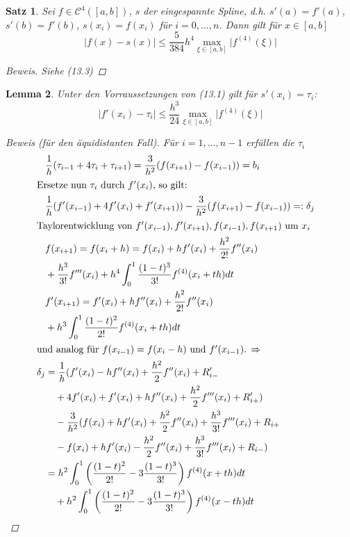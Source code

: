 \documentclass[12pt]{article}
\theoremstyle{break}
\newtheorem{theorem}{Satz}[subsection]
\newtheorem{lemma}[theorem]{Lemma}
\begin{document}
\begin{theorem}
Sei $f \in \mathcal{C}^4([a,b])$, $s$ der eingespannte Spline, d.h. $s'(a) = f'(a)$, $s'(b) = f'(b)$, $s(x_i) = f(x_i)$ für $i=0,...,n$. Dann gilt für $x\in [a,b]$
$$ \vert f(x) - s(x) \vert \leq \frac{5}{384} h^4 \max_{\xi \in[a,b]} \vert f^{(4)}(\xi) \vert $$
\begin{proof}[Beweis] Siehe (13.3)
\end{proof}
\end{theorem}

\begin{lemma}
Unter den Vorraussetzungen von (13.1) gilt für  $s'(x_i) = \tau_i$:
$$ \vert f'(x_i) - \tau_i \vert \leq \frac{h^3}{24} \max_{\xi \in [a,b]} \vert f^{(4)}(\xi) \vert$$
\begin{proof}[Beweis (für den äquidistanten Fall)]
Für $i=1, ..., n-1$ erfüllen die $\tau_i$ 
\begin{align*}
&\frac{1}{h} (\tau_{i-1} + 4 \tau_i + \tau_{i+1}) = \frac{3}{h^2} (f(x_{i+1}) - f(x_{i-1})) = b_i &\\
\intertext{Ersetze nun $\tau_i$ durch $f'(x_i)$, so gilt:}
&\frac{1}{h} (f'(x_{i-1}) + 4f'(x_i) + f'(x_{i+1})) - \frac{3}{h^2} ( f(x_{i+1}) - f(x_{i-1})) =: \delta_j &\\
\intertext{Taylorentwicklung von $f'(x_{i-1}), f'(x_{i+1}), f(x_{i-1}), f(x_{i+1})$ um $x_i$}
&f(x_{i+1}) = f(x_i + h) = f(x_i) + hf'(x_i) + \frac{h^2}{2!} f''(x_i) &\\
& + \frac{h^3}{3!} f'''(x_i) + h^4 \int_0^1 \frac{(1-t)^3}{3!} f^{(4)}(x_i+th) dt &\\
&f'(x_{i+1}) =  f'(x_i) + hf''(x_i) + \frac{h^2}{2!} f''(x_i) &\\
&+ h^3 \int_0^1 \frac{(1-t)^2}{2!} f^{(4)}(x_i+th) dt &\\
\intertext{und analog für $f(x_{i-1}) = f(x_i-h)$ und $f'(x_{i-1})$. $\Rightarrow$}
\delta_j &= \frac{1}{h} (f'(x_i) - hf''(x_i) + \frac{h^2}{2} f''(x_i) + R_{i-}' &\\
&\quad + 4 f'(x_i) + f'(x_i) + hf''(x_i) + \frac{h^2}{2} f'''(x_i) + R_{i+}') &\\
&\quad -\frac{3}{h^2} (f(x_i) + hf'(x_i) + \frac{h^2}{2}f''(x_i) + \frac{h^3}{3!} f'''(x_i) + R_{i+} &\\
&\quad- f(x_i) + hf'(x_i) - \frac{h^2}{2} f''(x_i) + \frac{h^3}{3!} f'''(x_i) + R_{i-}) &\\
&= h^2 \int_0^1 \left( \frac{(1-t)^2}{2!} - 3 \frac{(1-t)^3}{3!} \right) f^{(4)}(x+th) dt &\\
&\quad+ h^2 \int_0^1 \left( \frac{(1-t)^2}{2!} - 3 \frac{(1-t)^3}{3!} \right) f^{(4)}(x-th) dt &\\

\end{align*}
\end{proof}
\end{lemma}
\end{document}
